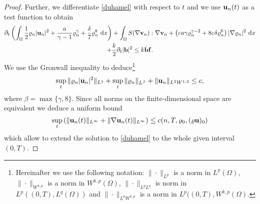 \documentclass{article}
\newcommand{\bb}{{\bf b}}
\newcommand{\vb}{\bb}
\newcommand{\vf}{{\bf f}}
\newcommand{\bu}{{\bf u}}
\newcommand{\vu}{\bu}
\newcommand{\bv}{{\bf v}}
\newcommand{\vv}{\bv}
\newcommand{\pat}{\partial_t}
\numberwithin{equation}{section}
\begin{document}
\begin{proof}
Further, we differentiate \eqref{duhamel} with respect to $t$ and we use $\vu_n(t)$ as a test function to obtain
\begin{multline}\label{first.energy}
\pat \left(\int_\Omega \frac 12 \varrho_n |\vu_n|^2 + \frac a{\gamma-1}\varrho_n^\gamma + \frac \delta 7 \varrho_n^8\ {\rm d}x\right) + \int_\Omega S(\nabla\vv_n):\nabla\vv_n  + \left(\varepsilon a \gamma \varrho_n^{\gamma-2} + 8\varepsilon \delta\varrho_n^6\right)|\nabla\varrho_n|^2 \ {\rm d}x\\ + \frac k2 \pat |\vb|^2  \leq k\dot\vb \vf.
\end{multline}
We use the Gronwall inequality to deduce\footnote{Hereinafter we use the following notation: $\|\cdot\|_{L^p}$ is a norm in $L^p(\Omega)$, $\|\cdot\|_{W^{k,p}}$ is a norm in $W^{k,p}(\Omega)$,  $\|\cdot\|_{L^pL^q}$ is norm in $L^p((0,T),L^q(\Omega))$ and $\|\cdot\|_{L^pW^{k,p}}$ is a norm in $L^p((0,T),W^{k,p}(\Omega)$.}
$$
\sup_t \|\varrho_n|\vu_n|^2\|_{L^1} + \sup_t \|\varrho_n\|_{L^\beta} + \|\vu_n\|_{L^2W^{1,2}}\leq c,
$$
where $\beta = \max\{\gamma,8\}$. Since all norms on the finite-dimensional space are equivalent we deduce a uniform bound
$$
\sup_t \left(\|\vu_n(t)\|_{L^\infty} + \|\nabla\vu_n(t)\|_{L^\infty}\right) \leq c(n,T,\varrho_0,(\varrho\vu)_0)
$$
which allow to extend the solution to \eqref{duhamel} to the whole given interval $(0,T)$. 


\end{proof}
\end{document}
